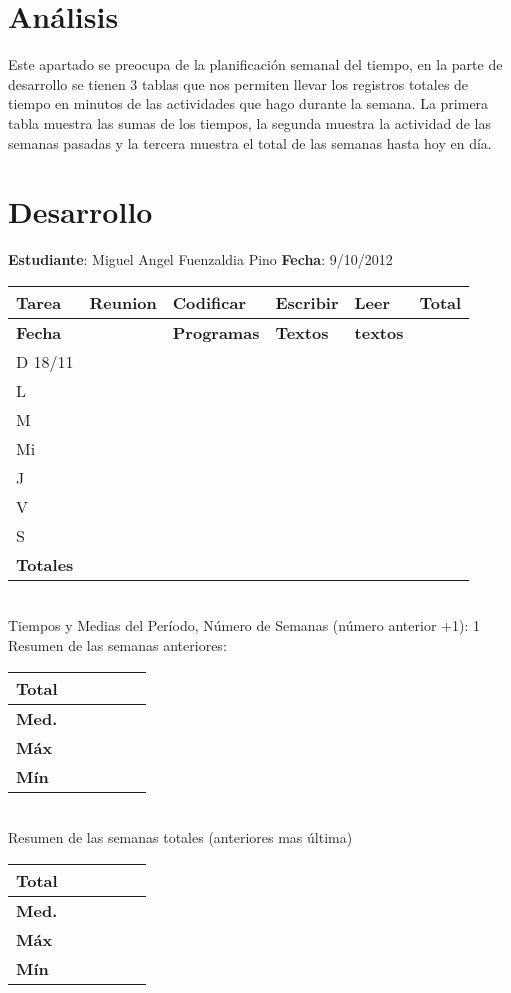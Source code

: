 \documentclass[a4paper,12pt,openany,oneside]{book}
\begin{document}
\section{Análisis}
Este apartado se preocupa de la planificación semanal del tiempo, en la parte de desarrollo se tienen 3 tablas que nos permiten llevar los registros totales de tiempo en minutos de las actividades que hago durante la semana. La primera tabla muestra las sumas de los tiempos, la segunda muestra la actividad de las semanas pasadas y la tercera muestra el total de las semanas hasta hoy en día.
\section{Desarrollo}
\newpage
\textbf{Estudiante}: Miguel Angel Fuenzaldia Pino     \textbf{Fecha}: 9/10/2012\\
\begin{tabular}{| l | l | l | l | l | l |}
\hline
\textbf{Tarea} & \textbf{Reunion} & \textbf{Codificar} & \textbf{Escribir} & \textbf{Leer} & \textbf{Total} \\
\hline
\textbf{Fecha} &                  & \textbf{Programas} & \textbf{Textos} & \textbf{textos} & \\
\hline
D 18/11 & & & & & \\
\hline
L & & & & & \\
\hline
M & & & & & \\
\hline
Mi & & & & & \\
\hline
J & & & & & \\
\hline
V & & & & & \\
\hline
S & & & & & \\
\hline
\textbf{Totales} & & & & & \\
\hline
\end{tabular}
\\
Tiempos y Medias del Período, Número de Semanas (número anterior +1): 1\\
Resumen de las semanas anteriores:\\
\begin{tabular}{| l | l | l | l | l | l |}
\hline
\textbf{Total} & & & & & \\
\hline
\textbf{Med.} & & & & & \\
\hline
\textbf{Máx} & & & & & \\
\hline
\textbf{Mín} & & & & & \\
\hline
\end{tabular}
\\
Resumen de las semanas totales (anteriores mas última)\\
\begin{tabular}{| l | l | l | l | l | l |}
\hline
\textbf{Total} & & & & & \\
\hline
\textbf{Med.} & & & & & \\
\hline
\textbf{Máx} & & & & & \\
\hline
\textbf{Mín} & & & & & \\
\hline
\end{tabular}
\end{document}
